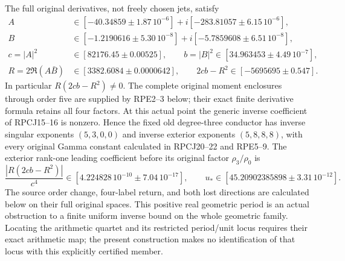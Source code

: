 The full original derivatives, not freely chosen jets, satisfy
\[
 \begin{aligned}
 A&\in[-40.34859\pm1.87\,10^{-6}]
                 +i[-283.81057\pm6.15\,10^{-6}],\\
 B&\in[-1.2190616\pm5.30\,10^{-8}]
                 +i[-5.7859608\pm6.51\,10^{-8}],\\
 c=|A|^2&\in[82176.45\pm0.00525],\qquad
 b=|B|^2\in[34.963453\pm4.49\,10^{-7}],\\
 R=2\Re(A\bar B)&\in[3382.6084\pm0.0000642],\qquad
 2cb-R^2\in[-5695695\pm0.547].
 \end{aligned}\tag{RPZ18}
\]
In particular $R(2cb-R^2)\ne0$. The complete original moment
enclosures through order five are supplied by RPE2--3 below; their
exact finite derivative formula retains all four factors. At this
actual point the generic inverse coefficient of RPCJ15--16 is
nonzero. Hence the fixed old degree-three conductor has inverse
singular exponents $(5,3,0,0)$ and inverse exterior exponents
$(5,8,8,8)$, with every original Gamma constant calculated in
RPCJ20--22 and RPE5--9. The exterior rank-one leading coefficient
before its original factor $\rho_3/\rho_0$ is
\[
 \frac{|R(2cb-R^2)|}{c^4}
       \in[4.224828\,10^{-10}\pm7.04\,10^{-17}],\qquad
 u_*\in[45.20902385898\pm3.31\,10^{-12}].\tag{RPZ19}
\]
The source order change, four-label return, and both lost directions
are calculated below on their full original spaces. This positive
real geometric period is an actual obstruction to a finite uniform
inverse bound on the whole geometric family. Locating the arithmetic
quartet and its restricted period/unit locus requires their exact
arithmetic map; the present construction makes no identification of
that locus with this explicitly certified member.
